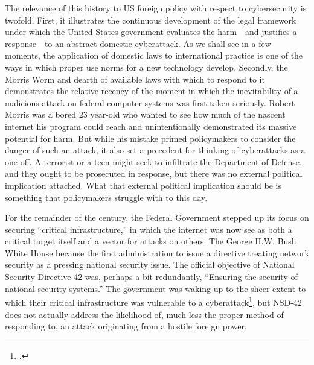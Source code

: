 \documentclass[12pt]{article}
\begin{document}
The relevance of this history to US foreign policy with respect to cybersecurity is twofold. First, it illustrates the continuous development of the legal framework under which the United States government evaluates the harm---and justifies a response---to an abstract domestic cyberattack. As we shall see in a few moments, the application of domestic laws to international practice is one of the ways in which proper use norms for a new technology develop. Secondly, the Morris Worm and dearth of available laws with which to respond to it demonstrates the relative recency of the moment in which the inevitability of a malicious attack on federal computer systems was first taken seriously. Robert Morris was a bored 23 year-old who wanted to see how much of the nascent internet his program could reach and unintentionally demonstrated its massive potential for harm. But while his mistake primed policymakers to consider the danger of such an attack, it also set a precedent for thinking of cyberattacks as a one-off. A terrorist or a teen might seek to infiltrate the Department of Defense, and they ought to be prosecuted in response, but there was no external political implication attached. What that external political implication should be is something that policymakers struggle with to this day.

For the remainder of the  century, the Federal Government stepped up its focus on securing ``critical infrastructure,'' in which the internet was now see as both a critical target itself and a vector for attacks on others. The George H.W. Bush White House because the first administration to issue a directive treating network security as a pressing national security issue. The official objective of National Security Directive 42 was, perhaps a bit redundantly, ``Ensuring the security of national security systems.'' The government was waking up to the sheer extent to which their critical infrastructure was vulnerable to a cyberattack\footcite{bush_national_1990}, but NSD-42 does not actually address the likelihood of, much less the proper method of responding to, an attack originating from a hostile foreign power. 
\end{document}
